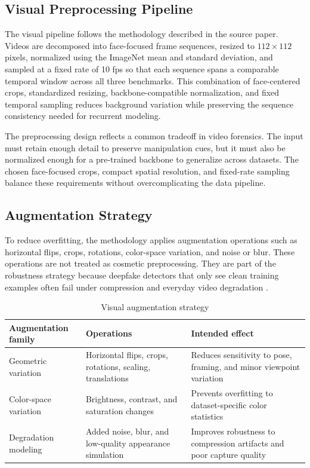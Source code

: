 \subsection{Visual Preprocessing Pipeline}

The visual pipeline follows the methodology described in the source paper. Videos are decomposed into face-focused frame sequences, resized to $112 \times 112$ pixels, normalized using the ImageNet mean and standard deviation, and sampled at a fixed rate of 10 fps so that each sequence spans a comparable temporal window across all three benchmarks. This combination of face-centered crops, standardized resizing, backbone-compatible normalization, and fixed temporal sampling reduces background variation while preserving the sequence consistency needed for recurrent modeling.

The preprocessing design reflects a common tradeoff in video forensics. The input must retain enough detail to preserve manipulation cues, but it must also be normalized enough for a pre-trained backbone to generalize across datasets. The chosen face-focused crops, compact spatial resolution, and fixed-rate sampling balance these requirements without overcomplicating the data pipeline.

\subsection{Augmentation Strategy}

To reduce overfitting, the methodology applies augmentation operations such as horizontal flips, crops, rotations, color-space variation, and noise or blur. These operations are not treated as cosmetic preprocessing. They are part of the robustness strategy because deepfake detectors that only see clean training examples often fail under compression and everyday video degradation \cite{papakipos2022augly}.

\begin{table}[H]
\centering
\small
\caption{Visual augmentation strategy}
\label{tab:visual-augmentation}
\begin{tabular}{p{}p{}p{}}
\toprule
\textbf{Augmentation family} & \textbf{Operations} & \textbf{Intended effect} \\
\midrule
Geometric variation & Horizontal flips, crops, rotations, scaling, translations & Reduces sensitivity to pose, framing, and minor viewpoint variation \\
Color-space variation & Brightness, contrast, and saturation changes & Prevents overfitting to dataset-specific color statistics \\
Degradation modeling & Added noise, blur, and low-quality appearance simulation & Improves robustness to compression artifacts and poor capture quality \\
\bottomrule
\end{tabular}
\end{table}

